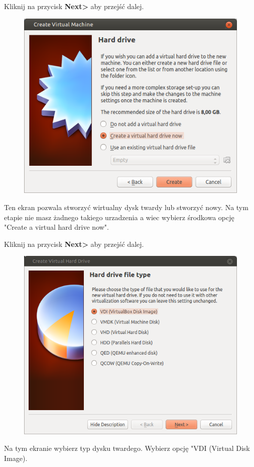 \begin{flushright}
Kliknij na przycisk \textbf{Next\textgreater} aby przejść dalej.
\end{flushright}
\clearpage
\begin{figure}
		\includegraphics[width=\linewidth]{images/virtualbox_wizard3.png}
\end{figure}
Ten ekran pozwala stworzyć wirtualny dysk twardy lub stworzyć nowy. Na tym etapie nie masz żadnego takiego urzadzenia a wiec wybierz środkowa opcję "Create a virtual hard drive now".

\begin{flushright}
Kliknij na przycisk \textbf{Next\textgreater} aby przejść dalej.
\end{flushright}
\clearpage
\begin{figure}
		\includegraphics[width=\linewidth]{images/virtualbox_wizard4.png}
\end{figure}
Na tym ekranie wybierz typ dysku twardego. Wybierz opcję "VDI (Virtual Disk Image).

